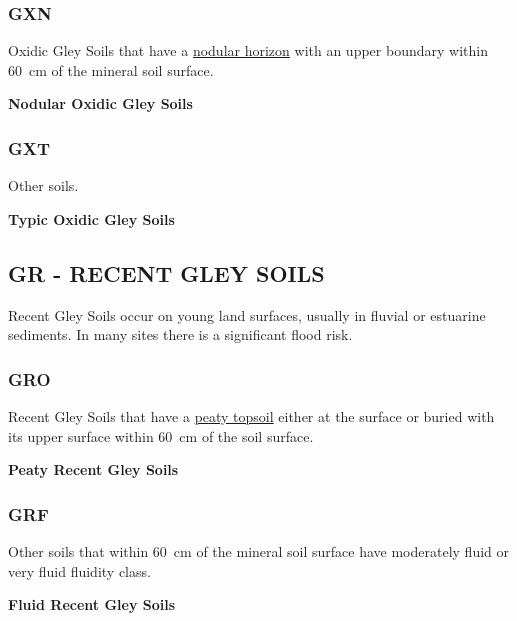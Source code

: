 \documentclass[
  letterpaper,
  DIV=11,
  numbers=noendperiod]{scrreprt}
\begin{document}
\hypertarget{sec-key-GXN}{%
\subsubsection{\texorpdfstring{\textbf{GXN}}{GXN}}\label{sec-key-GXN}}

Oxidic Gley Soils that have a \protect\hyperlink{sec-diag-nodh}{nodular
horizon} with an upper boundary within 60~cm of the mineral soil
surface.

\textbf{Nodular Oxidic Gley Soils}

\hypertarget{sec-key-GXT}{%
\subsubsection{\texorpdfstring{\textbf{GXT}}{GXT}}\label{sec-key-GXT}}

Other soils.

\textbf{Typic Oxidic Gley Soils}

\hypertarget{sec-GR}{%
\subsection{\texorpdfstring{\textbf{GR} - RECENT GLEY
SOILS}{GR - RECENT GLEY SOILS}}\label{sec-GR}}

Recent Gley Soils occur on young land surfaces, usually in fluvial or
estuarine sediments. In many sites there is a significant flood risk.

\hypertarget{sec-key-GRO}{%
\subsubsection{\texorpdfstring{\textbf{GRO}}{GRO}}\label{sec-key-GRO}}

Recent Gley Soils that have a \protect\hyperlink{sec-diag-pts}{peaty
topsoil} either at the surface or buried with its upper surface within
60~cm of the soil surface.

\textbf{Peaty Recent Gley Soils}

\hypertarget{sec-key-GRF}{%
\subsubsection{\texorpdfstring{\textbf{GRF}}{GRF}}\label{sec-key-GRF}}

Other soils that within 60~cm of the mineral soil surface have
moderately fluid or very fluid fluidity class.

\textbf{Fluid Recent Gley Soils}
\end{document}
